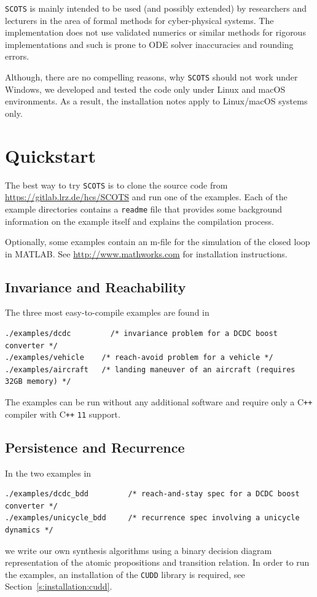 \documentclass[a4paper]{amsart}
\newcommand\Cpp{C\texttt{++} }
\begin{document}
{\tt SCOTS} is mainly intended to be used (and possibly extended) by researchers and
lecturers in the area of formal methods for
cyber-physical systems. The implementation does not use validated numerics or similar
methods for rigorous implementations and such is prone to ODE solver
inaccuracies and rounding errors.

Although, there are no compelling reasons, why {\tt SCOTS} should not work
under Windows, we developed and tested the code only under Linux and macOS
environments. As a result, the installation notes apply to
Linux/macOS systems only. 

\section{Quickstart}

The best way to try {\tt SCOTS} is to clone the source code from
\url{https://gitlab.lrz.de/hcs/SCOTS} and run one of the examples. Each of the
example directories contains a {\tt readme} file that provides some background
information on the example itself and explains the compilation
process. 

Optionally, some examples contain an m-file for the simulation of the
closed loop in MATLAB. See \url{http://www.mathworks.com} for installation
instructions.


\subsection{Invariance and Reachability}

The three most easy-to-compile examples are found in
\begin{lstlisting}[basicstyle=\small\ttfamily]
./examples/dcdc      	/* invariance problem for a DCDC boost converter */ 
./examples/vehicle    /* reach-avoid problem for a vehicle */ 
./examples/aircraft   /* landing maneuver of an aircraft (requires 32GB memory) */ 
\end{lstlisting}
The examples can be run without any additional software and require only a
\Cpp compiler with \Cpp{\tt11} support. 

\subsection{Persistence and Recurrence} In the two examples in
\begin{lstlisting}[basicstyle=\small\ttfamily]
./examples/dcdc_bdd        	/* reach-and-stay spec for a DCDC boost converter */ 
./examples/unicycle_bdd  	/* recurrence spec involving a unicycle dynamics */ 
\end{lstlisting}
we write our own synthesis algorithms using a binary decision diagram representation of the
atomic propositions and transition relation. In order to run the examples, an
installation of the 
{\tt CUDD} library is required, see Section~\ref{s:installation:cudd}.
\end{document}
